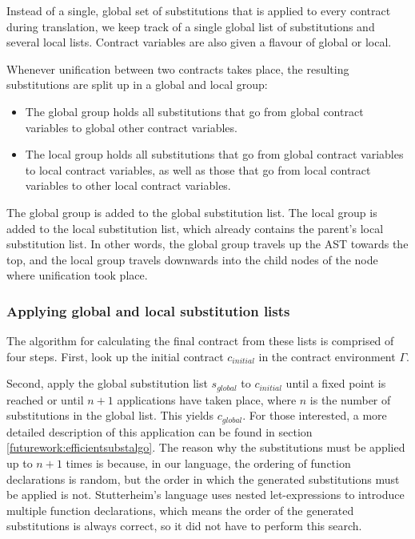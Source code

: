 \documentclass[10pt]{report}
\begin{document}
Instead of a single, global set of substitutions that is applied to every contract during translation, we keep track of a single global list of substitutions and several local lists.
Contract variables are also given a flavour of global or local.

Whenever unification between two contracts takes place, the resulting substitutions are split up in a global and local group:
\begin{itemize}
\item The global group holds all substitutions that go from global contract variables to global other contract variables.
\item The local group holds all substitutions that go from global contract variables to local contract variables, as well as those that go from local contract variables to other local contract variables.
\end{itemize}

The global group is added to the global substitution list.
The local group is added to the local substitution list, which already contains the parent's local substitution list.
In other words, the global group travels up the AST towards the top, and the local group travels downwards into the child nodes of the node where unification took place.

\subsubsection{Applying global and local substitution lists}

The algorithm for calculating the final contract from these lists is comprised of four steps.
First, look up the initial contract $c_{initial}$ in the contract environment $\Gamma$.

Second, apply the global substitution list $s_{global}$ to $c_{initial}$ until a fixed point is reached or until $n+1$ applications have taken place, where $n$ is the number of substitutions in the global list. 
This yields $c_{global}$.
For those interested, a more detailed description of this application can be found in section \ref{futurework:efficientsubstalgo}.
The reason why the substitutions must be applied up to $n+1$ times is because, in our language, the ordering of function declarations is random, but the order in which the generated substitutions must be applied is not.
Stutterheim's language uses nested let-expressions to introduce multiple function declarations, which means the order of the generated substitutions is always correct, so it did not have to perform this search.
\end{document}
